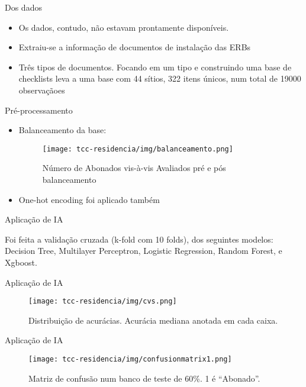 \documentclass{beamer}
\begin{document}
\begin{frame}{Dos dados}
  \begin{itemize}
  \item Os dados, contudo, não estavam prontamente disponíveis.
  \item Extraiu-se a informa\c{c}ão de documentos de instala\c{c}ão das ERBs
    \item Três tipos de documentos. Focando em um tipo e construindo uma base de
      checklists leva a uma base com 44 sítios, 322 itens únicos, num total de
      19000 observa\c{c}ãoes
\end{itemize}
\end{frame}


\begin{frame}{Pré-processamento}

  \begin{itemize}
  \item Balanceamento da base:
    \begin{figure}[h]
  \texttt{[image: tcc-residencia/img/balanceamento.png]}
  \caption{Número de Abonados vis-à-vis Avaliados pré e pós balanceamento}
  \label{ref:figbal}
    \end{figure}
    \item One-hot encoding foi aplicado também
  \end{itemize}

\end{frame}

\begin{frame}{Aplica\c{c}ão de IA}

  \begin{item}
    \item Foi feita a validação cruzada (k-fold com 10 folds), dos seguintes
      modelos: Decision Tree, Multilayer Perceptron, Logistic Regression,
      Random Forest, e Xgboost.
\end{item}
\end{frame}

\begin{frame}{Aplica\c{c}ão de IA}
  \begin{figure}[H]
  \texttt{[image: tcc-residencia/img/cvs.png]}
  \caption{Distribuição de acurácias. Acurácia mediana anotada em cada caixa.}
  \label{ref:figaccs}
\end{figure}
\end{frame}

\begin{frame}{Aplica\c{c}ão de IA}
   \begin{figure}[h]
   \centering
  \texttt{[image: tcc-residencia/img/confusionmatrix1.png]}
  \caption{Matriz de confusão num banco de teste de 60\%. 1 é ``Abonado''.}
  \label{ref:figmatriz}
\end{figure}

\end{frame}
\end{document}
